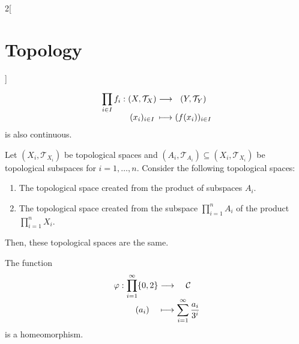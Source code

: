 \documentclass[../../../main.tex]{subfiles}
\begin{document}
\begin{multicols}{2}[\section{Topology}]
\begin{prop}
    $$
      \function{\displaystyle\prod_{i\in I}f_i}{\left(X,\mathcal{T}_X\right)}{\left(Y,\mathcal{T}_Y\right)}{(x_i)_{i\in I}}{(f(x_i))_{i\in I}}
    $$ is also continuous.
  \end{prop}
  \begin{prop}
    Let $(X_i,\mathcal{T}_{X_i})$ be topological spaces and $(A_i,\mathcal{T}_{A_i})\subseteq (X_i,\mathcal{T}_{X_i})$ be topological subspaces for $i=1,\ldots, n$. Consider the following topological spaces:
    \begin{enumerate}
      \item The topological space created from the product of subspaces $A_i$.
      \item The topological space created from the subspace $\prod_{i=1}^nA_i$ of the product $\prod_{i=1}^nX_i$.
    \end{enumerate}
    Then, these topological spaces are the same.
  \end{prop}
  \begin{theorem}
    The function
    $$
      \function{\varphi}{\displaystyle\prod_{i=1}^\infty\{0,2\}}{\mathcal{C}}{(a_i)}{\displaystyle\sum_{i=1}^\infty\frac{a_i}{3^i}}
    $$
    is a homeomorphism.
  \end{theorem}

\end{multicols}
\end{document}
